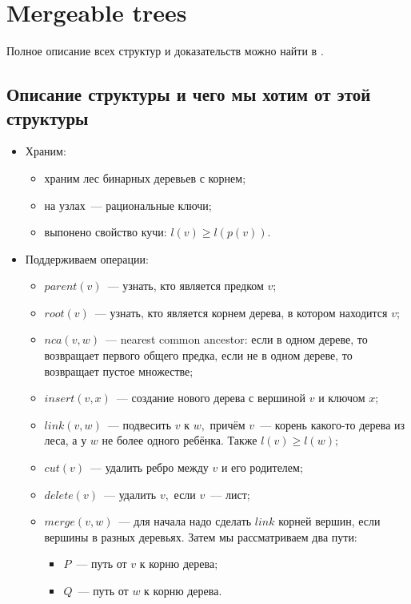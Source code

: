 
\section{Mergeable trees} 
Полное описание всех структур и доказательств можно найти в \cite{georgiadis2011data}.
\subsection{Описание структуры и чего мы хотим от этой структуры}
\begin{itemize}
    \item Храним:
    \begin{itemize}
        \item храним лес бинарных деревьев с корнем;
        \item на узлах~--- рациональные ключи;
        \item выпонено свойство кучи: $l(v)\geqslant l(p(v)).$
    \end{itemize}
    \item Поддерживаем операции:
    \begin{itemize}
        \item $parent(v)$~--- узнать, кто является предком $v$;
        \item $root(v)$~--- узнать, кто является корнем дерева, в котором находится $v$;
        \item  $nca(v, w)$~--- nearest common ancestor: если в одном дереве, то возвращает первого общего предка, если не в одном дереве, то возвращает пустое множестве;
        \item $insert(v, x)$~--- создание нового дерева с вершиной $v$ и ключом $x;$
        \item $link(v, w)$~--- подвесить $v$ к $w,$ причём $v$~--- корень какого-то дерева из леса, а у $w$ не более одного ребёнка. Также $l(v)\geqslant l(w);$
        \item $cut(v)$~--- удалить ребро между $v$ и его родителем;
       \item $delete(v)$~--- удалить $v,$ если $v$~--- лист;
       \item $merge(v, w)$~--- для начала надо сделать $link$ корней вершин, если вершины в разных деревьях. Затем мы рассматриваем два пути:
       \begin{itemize}
           \item $P$~--- путь от $v$ к корню дерева;
           \item $Q$~--- путь от $w$ к корню дерева.
       \end{itemize}

\end{itemize}
\end{itemize}
